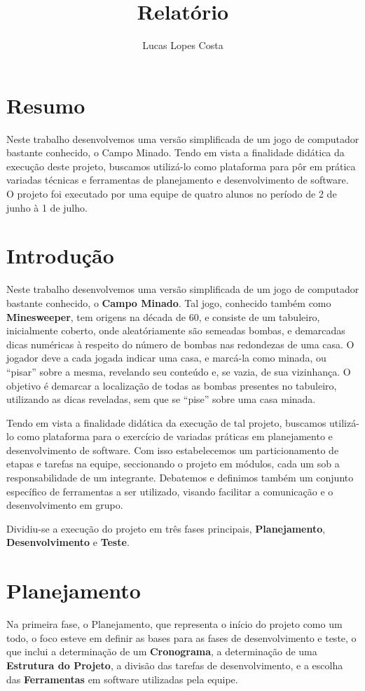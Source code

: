 \documentclass[10pt,a4paper]{report}
\author{Lucas Lopes Costa}
\title{Relatório}
\begin{document}
\tableofcontents

\chapter{Resumo}

Neste trabalho desenvolvemos uma versão simplificada de um jogo de computador bastante conhecido, o Campo Minado. Tendo em vista a finalidade didática da execução deste projeto, buscamos utilizá-lo como plataforma para pôr em prática variadas técnicas e ferramentas de planejamento e desenvolvimento de software. O projeto foi executado por uma equipe de quatro alunos no período de 2 de junho à 1 de julho.

\chapter{Introdução}

Neste trabalho desenvolvemos uma versão simplificada de um jogo de computador bastante conhecido, o \textbf{Campo Minado}. Tal jogo, conhecido também como \textbf{Minesweeper}, tem origens na década de 60, e consiste de um tabuleiro, inicialmente coberto, onde aleatóriamente são semeadas bombas, e demarcadas dicas numéricas à respeito do número de bombas nas redondezas de uma casa. O jogador deve a cada jogada indicar uma casa, e marcá-la como minada, ou ``pisar'' sobre a mesma, revelando seu conteúdo e, se vazia, de sua vizinhança. O objetivo é demarcar a localização de todas as bombas presentes no tabuleiro, utilizando as dicas reveladas, sem que se ``pise'' sobre uma casa minada.

Tendo em vista a finalidade didática da execução de tal projeto, buscamos utilizá-lo como plataforma para o exercício de variadas práticas em planejamento e desenvolvimento de software. Com isso estabelecemos um particionamento de etapas e tarefas na equipe, seccionando o projeto em módulos, cada um sob a responsabilidade de um integrante. Debatemos e definimos também um conjunto específico de ferramentas a ser utilizado, visando facilitar a comunicação e o desenvolvimento em grupo.

Dividiu-se a execução do projeto em três fases principais, \textbf{Planejamento}, \textbf{Desenvolvimento} e \textbf{Teste}.

\chapter{Planejamento}
Na primeira fase, o Planejamento, que representa o início do projeto como um todo, o foco esteve em definir as bases para as fases de desenvolvimento e teste, o que inclui a determinação de um \textbf{Cronograma}, a determinação de uma \textbf{Estrutura do Projeto}, a divisão das tarefas de desenvolvimento, e a escolha das \textbf{Ferramentas} em software utilizadas pela equipe.
\end{document}

